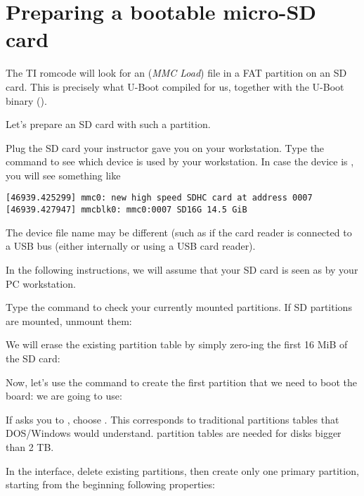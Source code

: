 \section{Preparing a bootable micro-SD card}

The TI romcode will look for an  ({\em MMC Load})
file in a FAT partition on an SD card. This is precisely what U-Boot
compiled for us, together with the U-Boot binary ().

Let's prepare an SD card with such a partition.

Plug the SD card your instructor gave you on your workstation. Type
the  command to see which device is used by your
workstation. In case the device is , you will see
something like

\begin{verbatim}
[46939.425299] mmc0: new high speed SDHC card at address 0007
[46939.427947] mmcblk0: mmc0:0007 SD16G 14.5 GiB
\end{verbatim}

The device file name may be different (such as 
if the card reader is connected to a USB bus (either internally
or using a USB card reader).

In the following instructions, we will assume that your SD card is
seen as  by your PC workstation.

Type the  command to check your currently mounted
partitions. If SD partitions are mounted, unmount them:


We will erase the existing partition table by simply zero-ing the
first 16 MiB of the SD card:


Now, let's use the  command to create the first partition
that we need to boot the board:
we are going to use:


If  asks you to , choose
. This corresponds to traditional partitions tables that DOS/Windows
would understand.  partition tables are needed for disks bigger
than 2 TB.

In the  interface, delete existing partitions, then
create only one primary partition, starting from the beginning
following properties:

